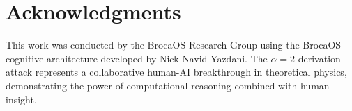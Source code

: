 \documentclass[11pt,titlepage]{article}
\begin{document}
\section*{Acknowledgments}

This work was conducted by the BrocaOS Research Group using the BrocaOS cognitive architecture developed by Nick Navid Yazdani. The $\alpha=2$ derivation attack represents a collaborative human-AI breakthrough in theoretical physics, demonstrating the power of computational reasoning combined with human insight.
\end{document}
